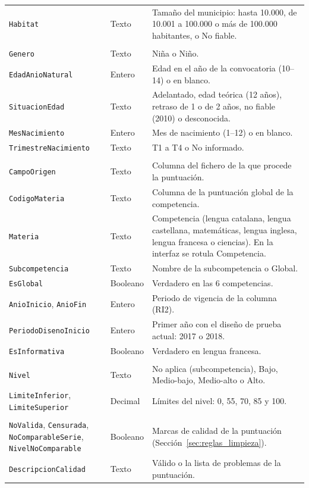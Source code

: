 \documentclass[12pt, a4paper, oneside]{report}
\begin{document}
{\begin{longtable}{@{} >{\raggedright\arraybackslash}p{4.2cm} >{\raggedright\arraybackslash}p{1.6cm} p{8.5cm} @{}}
\texttt{Habitat} & Texto & Tamaño del municipio: hasta 10.000, de 10.001 a 100.000 o más de 100.000 habitantes, o \guillemotleft{}No fiable\guillemotright{}. \\ \addlinespace
\multicolumn{3}{@{}l}{\textit{DimPerfilAlumno}} \\
\texttt{Genero} & Texto & Niña o Niño. \\
\texttt{EdadAnioNatural} & Entero & Edad en el año de la convocatoria (10--14) o en blanco. \\
\texttt{SituacionEdad} & Texto & Adelantado, edad teórica (12 años), retraso de 1 o de 2 años, no fiable (2010) o desconocida. \\
\texttt{MesNacimiento} & Entero & Mes de nacimiento (1--12) o en blanco. \\
\texttt{TrimestreNacimiento} & Texto & T1 a T4 o \guillemotleft{}No informado\guillemotright{}. \\ \addlinespace
\multicolumn{3}{@{}l}{\textit{DimCompetencia}} \\
\texttt{CampoOrigen} & Texto & Columna del fichero de la que procede la puntuación. \\
\texttt{CodigoMateria} & Texto & Columna de la puntuación global de la competencia. \\
\texttt{Materia} & Texto & Competencia (lengua catalana, lengua castellana, matemáticas, lengua inglesa, lengua francesa o ciencias). En la interfaz se rotula \guillemotleft{}Competencia\guillemotright{}. \\
\texttt{Subcompetencia} & Texto & Nombre de la subcompetencia o \guillemotleft{}Global\guillemotright{}. \\
\texttt{EsGlobal} & Booleano & Verdadero en las 6 competencias. \\
\texttt{AnioInicio}, \texttt{AnioFin} & Entero & Periodo de vigencia de la columna (RI2). \\
\texttt{PeriodoDisenoInicio} & Entero & Primer año con el diseño de prueba actual: 2017 o 2018. \\
\texttt{EsInformativa} & Booleano & Verdadero en lengua francesa. \\ \addlinespace
\multicolumn{3}{@{}l}{\textit{DimNivelLogro}} \\
\texttt{Nivel} & Texto & No aplica (subcompetencia), Bajo, Medio-bajo, Medio-alto o Alto. \\
\texttt{LimiteInferior}, \texttt{LimiteSuperior} & Decimal & Límites del nivel: 0, 55, 70, 85 y 100. \\ \addlinespace
\multicolumn{3}{@{}l}{\textit{DimCalidadDato}} \\
\texttt{NoValida}, \texttt{Censurada}, \texttt{NoComparableSerie}, \texttt{NivelNoComparable} & Booleano & Marcas de calidad de la puntuación (Sección~\ref{sec:reglas_limpieza}). \\
\texttt{DescripcionCalidad} & Texto & \guillemotleft{}Válido\guillemotright{} o la lista de problemas de la puntuación. \\
\end{longtable}}
\end{document}
